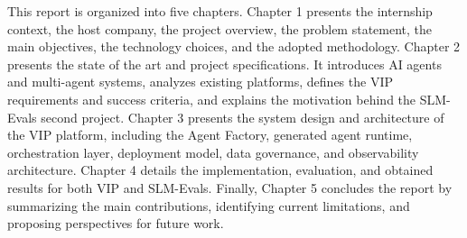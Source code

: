 This report is organized into five chapters. Chapter 1 presents the internship context, the host company, the project overview, the problem statement, the main objectives, the technology choices, and the adopted methodology. Chapter 2 presents the state of the art and project specifications. It introduces AI agents and multi-agent systems, analyzes existing platforms, defines the VIP requirements and success criteria, and explains the motivation behind the SLM-Evals second project. Chapter 3 presents the system design and architecture of the VIP platform, including the Agent Factory, generated agent runtime, orchestration layer, deployment model, data governance, and observability architecture. Chapter 4 details the implementation, evaluation, and obtained results for both VIP and SLM-Evals. Finally, Chapter 5 concludes the report by summarizing the main contributions, identifying current limitations, and proposing perspectives for future work.
